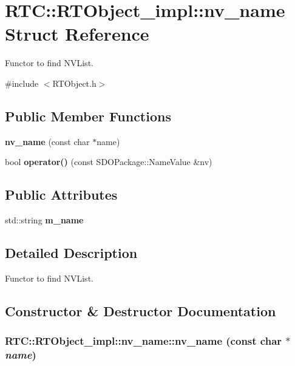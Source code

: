 \section{RTC::RTObject\_\-impl::nv\_\-name Struct Reference}
\label{structRTC_1_1RTObject__impl_1_1nv__name}


Functor to find NVList.  




{\ttfamily \#include $<$RTObject.h$>$}

\subsection*{Public Member Functions}
\begin{DoxyCompactItemize}
\item 
{\bf nv\_\-name} (const char $\ast$name)
\item 
bool {\bf operator()} (const SDOPackage::NameValue \&nv)
\end{DoxyCompactItemize}
\subsection*{Public Attributes}
\begin{DoxyCompactItemize}
\item 
std::string {\bf m\_\-name}
\end{DoxyCompactItemize}


\subsection{Detailed Description}
Functor to find NVList. 

\subsection{Constructor \& Destructor Documentation}
\subsubsection[{nv\_\-name}]{\setlength{\rightskip}{0pt plus 5cm}RTC::RTObject\_\-impl::nv\_\-name::nv\_\-name (const char $\ast$ {\em name})\hspace{0.3cm}{\ttfamily  [inline]}}\label{structRTC_1_1RTObject__impl_1_1nv__name_ac77f24a1c8c6b7e2b106bb45e881cd3c}


